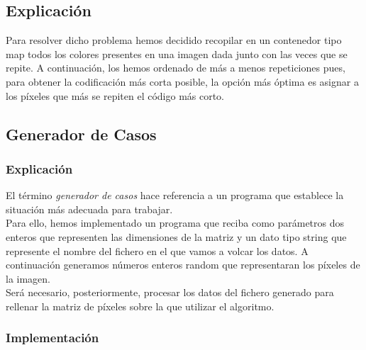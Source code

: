 \documentclass[a4paper,12pt,twoside]{article} %
\begin{document}
\newpage

\subsection{Explicación}

Para resolver dicho problema hemos decidido recopilar en un contenedor tipo map todos los colores presentes en una imagen dada junto con las veces que se repite. A continuación, los hemos ordenado de más a menos repeticiones pues, para obtener la codificación más corta posible, la opción más óptima es asignar a los píxeles que más se repiten el código más corto.\\

\subsection{Generador de Casos}

\subsubsection{Explicación}
El término \textit{generador de casos} hace referencia a un programa que establece la situación más adecuada para trabajar.\\

Para ello, hemos implementado un programa que reciba como parámetros dos enteros que representen las dimensiones de la matriz y un dato tipo string que represente el nombre del fichero en el que vamos a volcar los datos. A continuación generamos números enteros random que representaran los píxeles de la imagen.\\

Será necesario, posteriormente, procesar los datos del fichero generado para rellenar la matriz de píxeles sobre la que utilizar el algoritmo.

\newpage

\subsubsection{Implementación}
\end{document}
